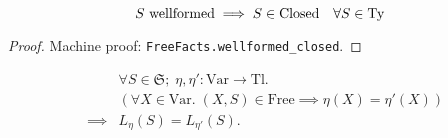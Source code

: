 \documentclass{llncs}
\newcommand*{\Var}{\mathrm{Var}}
\newcommand*{\Ty}{\mathrm{Ty}}
\newcommand*{\Tl}{\mathrm{Tl}}
\renewcommand*{\S}{\mathfrak{S}}
\newcommand*{\Free}{\mathrm{Free}}
\newcommand*{\Closed}{\mathrm{Closed}}
\newcommand*{\wf}[1]{\text{$#1$ {\normalfont \rmfamily wellformed}}}
\renewcommand*{\|}{\;|\;}
\newcommand*{\machproofc}[1]{Machine proof: \code{#1}.}
\newcommand*{\code}[1]{\texttt{#1}}
\begin{document}
\begin{lemma}
  \label{lemma:wellformed_closed}
  \begin{equation*}
    \wf{S} \implies S \in \Closed \quad \forall S \in \Ty
  \end{equation*}
\end{lemma}

\begin{proof}
  \machproofc{FreeFacts.wellformed\_closed}
\end{proof}


\begin{lemma}
  \label{lemma:eta_irrelevant1}
  \begin{eqnarray*}
    &&         \forall S \in \S;\; \eta, \eta'\colon \Var \to \Tl. \\
    &&         (\forall X \in \Var.\; (X, S) \in \Free \implies \eta(X) = \eta'(X)) \\
    &\implies& L_\eta(S) = L_{\eta'}(S).
  \end{eqnarray*}
\end{lemma}
\end{document}
